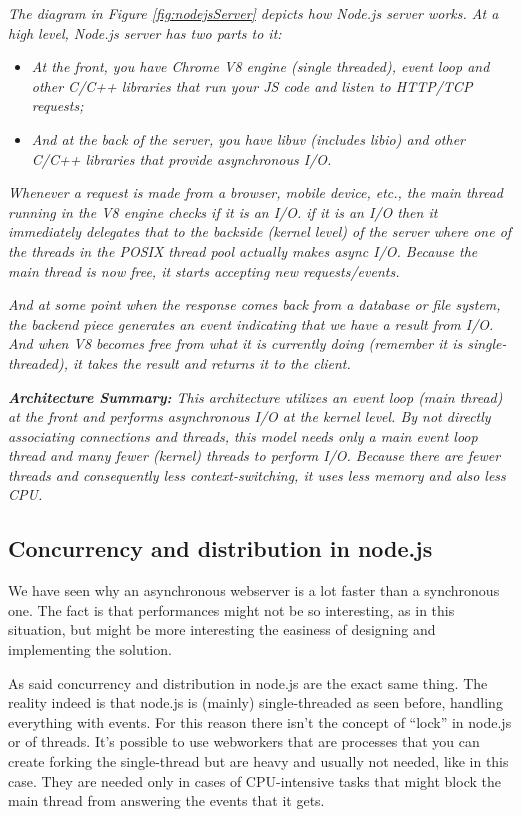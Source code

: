 \textit{The diagram in Figure \ref{fig:nodejsServer} depicts how Node.js server works. At a high level, Node.js server has two parts to it:}
\begin{itemize}
\item \textit{At the front, you have Chrome V8 engine (single threaded), event loop and other C/C++ libraries that run your JS code and listen to HTTP/TCP requests;}
\item \textit{And at the back of the server, you have libuv (includes libio) and other C/C++ libraries that provide asynchronous I/O.}
\end{itemize}

\textit{Whenever a request is made from a browser, mobile device, etc., the main thread running in the V8 engine checks if it is an I/O. if it is an I/O then it immediately delegates that to the backside (kernel level) of the server where one of the threads in the POSIX thread pool actually makes async I/O. Because the main thread is now free, it starts accepting new requests/events.}

\textit{And at some point when the response comes back from a database or file system, the backend piece generates an event indicating that we have a result from I/O. And when V8 becomes free from what it is currently doing (remember it is single-threaded), it takes the result and returns it to the client.}

\textit{\textbf{Architecture Summary:} This architecture utilizes an event loop (main thread) at the front and performs asynchronous I/O at the kernel level. By not directly associating connections and threads, this model needs only a main event loop thread and many fewer (kernel) threads to perform I/O. Because there are fewer threads and consequently less context-switching, it uses less memory and also less CPU.}

\subsection{Concurrency and distribution in node.js}

We have seen why an asynchronous webserver is a lot faster than a synchronous one. The fact is that performances might not be so interesting, as in this situation, but might be more interesting the easiness of designing and implementing the solution.

As said concurrency and distribution in node.js are the exact same thing. The reality indeed is that node.js is (mainly) single-threaded as seen before, handling everything with events. For this reason there isn't the concept of ``lock'' in node.js or of threads. It's possible to use webworkers that are processes that you can create forking the single-thread but are heavy and usually not needed, like in this case. They are needed only in cases of CPU-intensive tasks that might block the main thread from answering the events that it gets.

